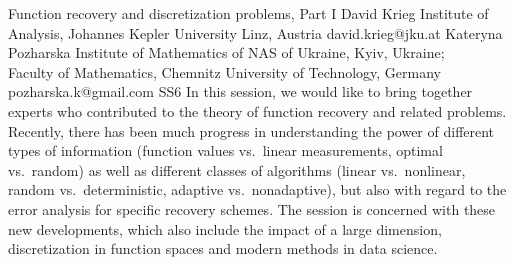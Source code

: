 \documentclass[12pt,a4paper,figuresright]{book}
\begin{document}
\begin{session}
 {Function recovery and discretization problems, Part I}%
 {David Krieg}%
 {Institute of Analysis, Johannes Kepler University Linz, Austria}%
 {david.krieg@jku.at}%
 {Kateryna Pozharska}%
 {Institute of Mathematics of NAS of Ukraine, Kyiv, Ukraine; \\ Faculty of Mathematics, Chemnitz University of Technology,
Germany}%
 {pozharska.k@gmail.com}%
 {SS6}%
 {}%
In this session, we would like to bring together experts who contributed to the theory of function recovery and related problems.
Recently, there has been much progress in understanding the power of different types of information (function values vs.\ linear measurements, optimal vs.\ random)
as well as different classes of algorithms (linear vs.\ nonlinear, random vs.\ deterministic, adaptive vs.\ nonadaptive), but also with regard to the error analysis for specific recovery schemes.
The session is concerned with these new developments, which also include the impact of a large dimension, discretization in function spaces and modern methods in data science.
\end{session}



%


\clearpage
\end{document}
